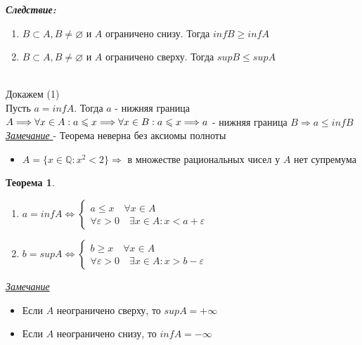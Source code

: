\documentclass[12pt,letterpaper]{report}
\makeatletter
\newtheorem*{theorem-non}{Теорема}
\newcommand{\Q}{\mathbb{Q}}
\newcommand{\follow}{\textbf{\textit{Следствие:}}}
\newcommand{\notice}{\underline{\textit{Замечание }}}
\renewenvironment{proof}[1][\proofname]{%
   \par\pushQED{\qed}\normalfont%
   \topsep6\p@\@plus6\p@\relax
   \trivlist\item[\hskip\labelsep\bfseries#1\@addpunct{.}]%
   \ignorespaces
}{%
   \popQED\endtrivlist\@endpefalse
}
\makeatother
\begin{document}
\follow
\begin{enumerate}
    \item $B \subset A, B \neq \varnothing $ и $ A $ ограничено снизу. Тогда $inf B \geqslant inf A$
    \item $B \subset A, B \neq \varnothing $ и $ A $ ограничено сверху. Тогда $sup B \leqslant sup A$
\end{enumerate}
\begin{proof}
    \quad \\
    Докажем (1) \\
    Пусть $a = inf A$. Тогда $a$ - нижняя граница $A \Longrightarrow \forall x \in
    A : a \leqslant x \Longrightarrow \forall x \in B : a \leqslant x \Longrightarrow \\
    a$ - нижняя граница $B \Longrightarrow a \leqslant inf B$  
\end{proof}
\notice - Теорема неверна без аксиомы полноты \\
\begin{itemize}
    \item[] $A =\{x \in \Q : x^2 < 2\} \Longrightarrow$ в множестве рациональных чисел у $A$ нет супремума
\end{itemize}
\begin{theorem-non}
    \quad \\
    \begin{enumerate}
        \item $a = inf A \Longleftrightarrow 
        \begin{cases}
            a \leqslant x \quad \forall x \in A \\
            \forall \varepsilon > 0 \quad \exists x \in A : x < a + \varepsilon
        \end{cases}$ 
        \item $b = sup A \Longleftrightarrow 
        \begin{cases}
            b \geqslant x \quad \forall x \in A \\
            \forall \varepsilon > 0 \quad \exists x \in A : x > b - \varepsilon
        \end{cases}$ 
    \end{enumerate}
\end{theorem-non}
\notice
\begin{itemize}
    \item Если $A$ неограничено сверху, то $sup A = +\infty$
    \item Если $A$ неограничено снизу, то $inf A = -\infty$
\end{itemize}
\end{document}
